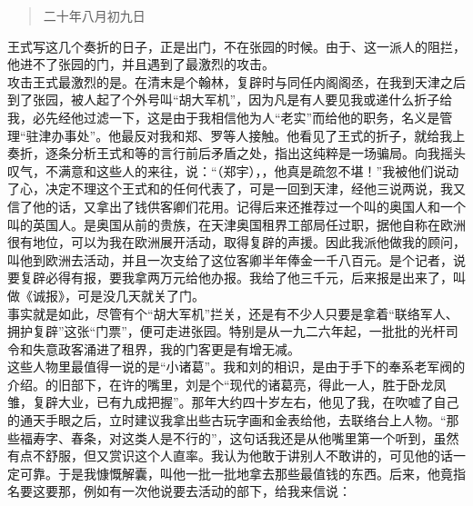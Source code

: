 \begin{quote}
\begin{flushright}
	二十年八月初九日\\
\end{flushright}
\end{quote}

王式写这几个奏折的日子，正是出门，不在张园的时候。由于、这一派人的阻拦，他进不了张园的门，并且遇到了最激烈的攻击。\\

攻击王式最激烈的是。在清末是个翰林，复辟时与同任内阁阁丞，在我到天津之后到了张园，被人起了个外号叫“胡大军机”，因为凡是有人要见我或递什么折子给我，必先经他过滤一下，这是由于我相信他为人“老实”而给他的职务，名义是管理“驻津办事处”。他最反对我和郑、罗等人接触。他看见了王式的折子，就给我上奏折，逐条分析王式和等的言行前后矛盾之处，指出这纯粹是一场骗局。向我摇头叹气，不满意和这些人的来往，说：“（郑宇），，他真是疏忽不堪！”我被他们说动了心，决定不理这个王式和的任何代表了，可是一回到天津，经他三说两说，我又信了他的话，又拿出了钱供客卿们花用。记得后来还推荐过一个叫的奥国人和一个叫的英国人。是奥国从前的贵族，在天津奥国租界工部局任过职，据他自称在欧洲很有地位，可以为我在欧洲展开活动，取得复辟的声援。因此我派他做我的顾问，叫他到欧洲去活动，并且一次支给了这位客卿半年俸金一千八百元。是个记者，说要复辟必得有报，要我拿两万元给他办报。我给了他三千元，后来报是出来了，叫做《诚报》，可是没几天就关了门。\\

事实就是如此，尽管有个“胡大军机”拦关，还是有不少人只要是拿着“联络军人、拥护复辟”这张“门票”，便可走进张园。特别是从一九二六年起，一批批的光杆司令和失意政客涌进了租界，我的门客更是有增无减。\\

这些人物里最值得一说的是“小诸葛”。我和刘的相识，是由于手下的奉系老军阀的介绍。的旧部下，在许的嘴里，刘是个“现代的诸葛亮，得此一人，胜于卧龙凤雏，复辟大业，已有九成把握”。那年大约四十岁左右，他见了我，在吹嘘了自己的通天手眼之后，立时建议我拿出些古玩字画和金表给他，去联络台上人物。“那些福寿字、春条，对这类人是不行的”，这句话我还是从他嘴里第一个听到，虽然有点不舒服，但又赏识这个人直率。我认为他敢于讲别人不敢讲的，可见他的话一定可靠。于是我慷慨解囊，叫他一批一批地拿去那些最值钱的东西。后来，他竟指名要这要那，例如有一次他说要去活动的部下，给我来信说：\\

